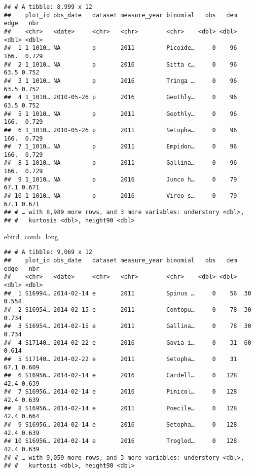 \documentclass[
]{article}
\newenvironment{Shaded}{\begin{snugshade}}{\end{snugshade}}
\newcommand{\NormalTok}[1]{#1}
\begin{document}
\begin{verbatim}
## # A tibble: 8,999 x 12
##    plot_id obs_date   dataset measure_year binomial   obs   dem  edge   nbr
##    <chr>   <date>     <chr>   <chr>        <chr>    <dbl> <dbl> <dbl> <dbl>
##  1 1_1010… NA         p       2011         Picoide…     0    96 166.  0.729
##  2 1_1010… NA         p       2016         Sitta c…     0    96  63.5 0.752
##  3 1_1010… NA         p       2016         Tringa …     0    96  63.5 0.752
##  4 1_1010… 2010-05-26 p       2016         Geothly…     0    96  63.5 0.752
##  5 1_1010… NA         p       2011         Geothly…     0    96 166.  0.729
##  6 1_1010… 2010-05-26 p       2011         Setopha…     0    96 166.  0.729
##  7 1_1010… NA         p       2011         Empidon…     0    96 166.  0.729
##  8 1_1010… NA         p       2011         Gallina…     0    96 166.  0.729
##  9 1_1010… NA         p       2016         Junco h…     0    79  67.1 0.671
## 10 1_1010… NA         p       2016         Vireo s…     0    79  67.1 0.671
## # … with 8,989 more rows, and 3 more variables: understory <dbl>,
## #   kurtosis <dbl>, height90 <dbl>
\end{verbatim}

\begin{Shaded}
\begin{Highlighting}[]
\NormalTok{ebird_comb_long}
\end{Highlighting}
\end{Shaded}

\begin{verbatim}
## # A tibble: 9,069 x 12
##    plot_id obs_date   dataset measure_year binomial   obs   dem  edge   nbr
##    <chr>   <date>     <chr>   <chr>        <chr>    <dbl> <dbl> <dbl> <dbl>
##  1 S16994… 2014-02-14 e       2011         Spinus …     0    56  30   0.558
##  2 S16954… 2014-02-15 e       2011         Contopu…     0    78  30   0.734
##  3 S16954… 2014-02-15 e       2011         Gallina…     0    78  30   0.734
##  4 S17140… 2014-02-22 e       2016         Gavia i…     0    31  60   0.614
##  5 S17140… 2014-02-22 e       2011         Setopha…     0    31  67.1 0.609
##  6 S16956… 2014-02-14 e       2016         Cardell…     0   128  42.4 0.639
##  7 S16956… 2014-02-14 e       2016         Pinicol…     0   128  42.4 0.639
##  8 S16956… 2014-02-14 e       2011         Poecile…     0   128  42.4 0.664
##  9 S16956… 2014-02-14 e       2016         Setopha…     0   128  42.4 0.639
## 10 S16956… 2014-02-14 e       2016         Troglod…     0   128  42.4 0.639
## # … with 9,059 more rows, and 3 more variables: understory <dbl>,
## #   kurtosis <dbl>, height90 <dbl>
\end{verbatim}
\end{document}
